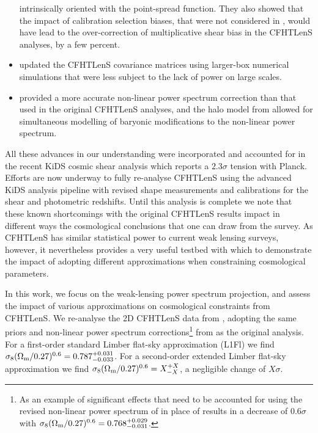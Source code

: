\begin{itemize}
{intrinsically oriented with the point-spread function.  They also showed that
the impact of calibration selection biases, that were not considered in
\citet{CFHTLenS-shapes}, would have lead to the over-correction of
multiplicative shear bias in the CFHTLenS analyses, by a few percent.}
%
\item{\citet{joudaki/etal:2016} updated the CFHTLenS covariance matrices using
larger-box numerical simulations that were less subject to the lack of power on
large scales.}
\item{\cite{2012ApJ...761..152T} provided a more accurate non-linear power
spectrum correction than that used in the original CFHTLenS analyses, and the
halo model from \cite{2015MNRAS.454.1958M} allowed for simultaneous modelling
of baryonic modifications to the non-linear power spectrum.} 
%
\end{itemize}
%
All these advances in our understanding were incorporated and accounted for in
the recent KiDS cosmic shear analysis \citep{KiDS-450} which reports a $2.3
\sigma$ tension with Planck.  Efforts are now underway to fully re-analyse
CFHTLenS using the advanced KiDS analysis pipeline with revised shape
measurements and calibrations for the shear and photometric redshifts.  Until
this analysis is complete we note that these known shortcomings with the
original CFHTLenS results impact in different ways the cosmological conclusions
that one can draw from the survey.  As CFHTLenS has similar statistical power
to current weak lensing surveys, however, it nevertheless provides a very
useful testbed with which to demonstrate the impact of adopting different
approximations when constraining cosmological parameters.

In this work, we focus on the weak-lensing power spectrum projection, and
assess the impact of various approximations on cosmological constraints from
CFHTLenS. We re-analyse the 2D CFHTLenS data from \cite{CFHTLenS-2pt-notomo},
adopting the same priors and non-linear power spectrum corrections\footnote{As
an example of significant effects that need to be accounted for using the
revised non-linear power spectrum of \cite{2012ApJ...761..152T} in place of
\cite{2003MNRAS.341.1311S} results in a decrease of $0.6 \sigma$ with $\sigma_8
(\Omega_{\rm m}/0.27)^{0.6} =0.768^{+0.029}_{-0.031}$.} from
\cite{2003MNRAS.341.1311S} as the original \cite{CFHTLenS-2pt-notomo} analysis.
For a first-order standard Limber flat-sky approximation (L1Fl) we find
$\sigma_8 (\Omega_{\rm m}/0.27)^{0.6} =0.787^{+0.031}_{-0.033}$. For a
second-order extended Limber flat-sky approximation we find $\sigma_8
(\Omega_{\rm m}/0.27)^{0.6} =X^{+X}_{-X}$, a negligible change of
$X\sigma$. 

